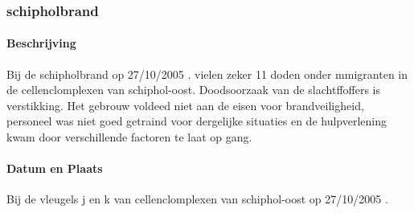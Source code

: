 \documentclass{article}
\begin{document}
	\subsubsection{schipholbrand}
	\paragraph{Beschrijving}
	Bij de schipholbrand op 27/10/2005 . 
	vielen zeker 11 doden onder mmigranten in de cellenclomplexen van schiphol-oost. Doodsoorzaak van de slachtffoffers is verstikking. Het gebrouw voldeed niet aan de eisen voor brandveiligheid, personeel was niet goed getraind voor dergelijke situaties en de hulpverlening kwam door verschillende factoren te laat op gang.
	\paragraph{Datum en Plaats}
	Bij de vleugels j en k  van cellenclomplexen van schiphol-oost op 27/10/2005  . 
\end{document}

